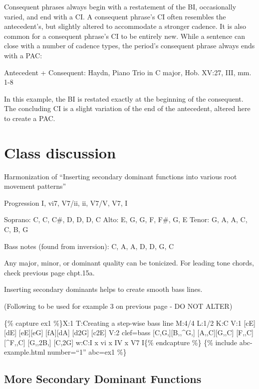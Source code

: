 \documentclass{book}
\begin{document}
Consequent phrases always begin with a restatement of the BI, occasionally
varied, and end with a CI. A consequent phrase's CI often resembles the
antecedent's, but slightly altered to accommodate a stronger cadence. It is
also common for a consequent phrase's CI to be entirely new. While a sentence
can close with a number of cadence types, the period's consequent phrase
always ends with a PAC:

Antecedent + Consequent: Haydn, Piano Trio in C major, Hob. XV:27, III, mm.
1-8

In this example, the BI is restated exactly at the beginning of the
consequent. The concluding CI is a slight variation of the end of the
antecedent, altered here to create a PAC.

\hypertarget{class-discussion-22}{%
\chapter{Class discussion}\label{class-discussion-22}}

Harmonization of ``Inserting secondary dominant functions into various root
movement patterns''

Progression I, vi7, V7/ii, ii, V7/V, V7, I

Soprano: C, C, C\#, D, D, D, C Alto: E, G, G, F, F\#, G, E Tenor: G, A, A, C,
C, B, G

Bass notes (found from inversion): C, A, A, D, D, G, C

Any major, minor, or dominant quality can be tonicized. For leading tone
chords, check previous page chpt.15a.

Inserting secondary dominants helps to create smooth bass lines.

(Following to be used for example 3 on previous page - DO NOT ALTER)

\{\% capture ex1 \%\}X:1 T:Creating a step-wise bass line M:4/4 L:1/2 K:C V:1
{[}cE{]}{[}dE{]}\textbar{} {[}eE{]}{[}eG{]}\textbar{}
{[}fA{]}{[}dA{]}\textbar{} {[}d2G{]}\textbar{} {[}c2E{]}\textbar{]} V:2
clef=bass {[}C,G,{]}{[}B,,\^{}G,{]}\textbar{} {[}A,,C{]}{[}G,,C{]}\textbar{}
{[}F,,C{]}{[}\^{}F,,C{]}\textbar{} {[}G,,2B,{]}\textbar{}
{[}C,2G{]}\textbar{]} w:C:I x vi x IV x V7 I\{\% endcapture \%\} \{\% include
abc-example.html number=``1'' abc=ex1 \%\}

\hypertarget{more-secondary-dominant-functions}{%
\section{More Secondary Dominant
Functions}\label{more-secondary-dominant-functions}}
\end{document}
